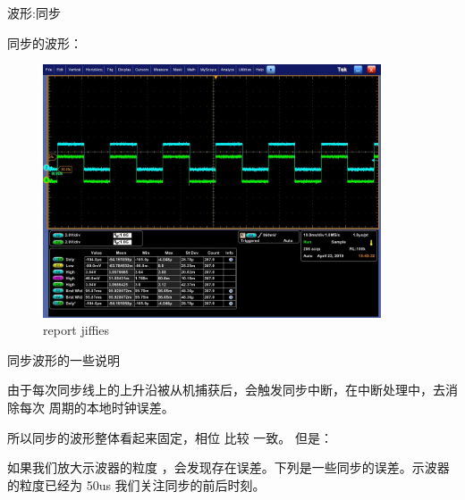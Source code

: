 \begin{frame}[fragile]{波形:同步}

同步的波形：

  \begin{figure}[htbp]
  \begin{center}
  \includegraphics[width=10cm]{img/sync}
  \caption{report jiffies}
  \label{report}
  \end{center}
  \vspace{-0.5em}
  \end{figure}


\end{frame}

\begin{frame}[fragile]{同步波形的一些说明}

由于每次同步线上的上升沿被从机捕获后，会触发同步中断，在中断处理中，去消除每次
周期的本地时钟误差。

所以同步的波形整体看起来固定，相位 比较 一致。 但是：

如果我们放大示波器的粒度 ，会发现存在误差。下列是一些同步的误差。示波器的粒度已经为
50us 我们关注同步的前后时刻。

\end{frame}



